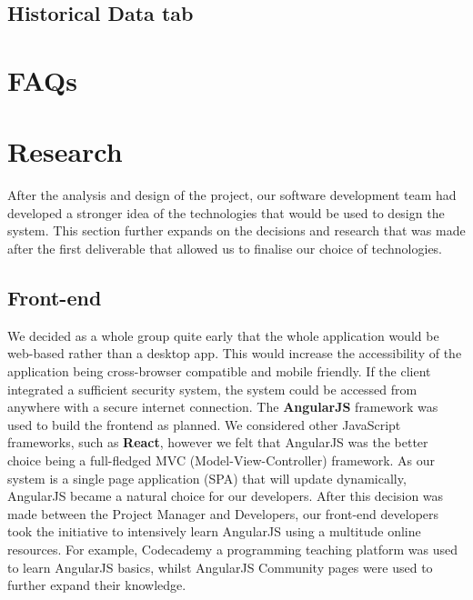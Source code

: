\documentclass[12pt]{article}
\begin{document}
  \subsection{Historical Data tab}
\section{FAQs}
\section{Research}
  After the analysis and design of the project, our software development team had developed a stronger idea
  of the technologies that would be used to design the system. This section further expands on the decisions and
  research that was made after the first deliverable that allowed us to finalise our choice of technologies.
  \subsection{Front-end}
  We decided as a whole group quite early that the whole application would be web-based rather than a desktop app. This would
  increase the accessibility of the application being cross-browser compatible and mobile friendly. If the client integrated a sufficient
  security system, the system could be accessed from anywhere with a secure internet connection.\newline
  The \textbf{AngularJS} framework was used to build the frontend as planned. We considered other JavaScript frameworks,
  such as \textbf{React}, however we felt that AngularJS was the better choice being a full-fledged MVC (Model-View-Controller) framework.
  As our system is a single page application (SPA) that will update dynamically, AngularJS became a natural choice for our developers.
  \newline
  After this decision was made between the Project Manager and Developers, our front-end developers took the initiative to intensively learn AngularJS using a multitude online resources.
  For example, Codecademy a programming teaching platform was used to learn AngularJS basics, whilst AngularJS Community pages were used to further expand their knowledge.
\end{document}

